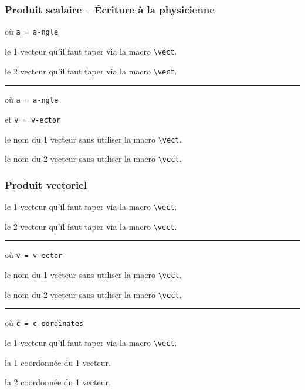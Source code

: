 \documentclass[12pt,a4paper]{article}
\newcommand\env[1]{\texttt{#1}}
\newcommand\macro[1]{\env{\textbackslash{}#1}}
\theoremstyle{definition}
\newcommand\separation{
	\medskip
	\hfill\rule{0.5\textwidth}{0.75pt}\hfill
	\medskip
}
\newcommand\mwhyprefix[2]{%
	\texttt{#1 = #1-#2}%
}
\begin{document}



\subsubsection{Produit scalaire -- Écriture \og à la physicienne \fg}

 où \quad \mwhyprefix{a}{ngle}


 le 1\ier{} vecteur qu'il faut taper via la macro \macro{vect}.

 le 2\ieme{} vecteur qu'il faut taper via la macro \macro{vect}.


\separation


 où \quad \mwhyprefix{a}{ngle} 
                              et \mwhyprefix{v}{ector}

 le nom du 1\ier{} vecteur sans utiliser la macro \macro{vect}.

 le nom du 2\ieme{} vecteur sans utiliser la macro \macro{vect}.





\subsubsection{Produit vectoriel}



 le 1\ier{} vecteur qu'il faut taper via la macro \macro{vect}.

 le 2\ieme{} vecteur qu'il faut taper via la macro \macro{vect}.


\separation


 où \quad \mwhyprefix{v}{ector}

 le nom du 1\ier{} vecteur sans utiliser la macro \macro{vect}.

 le nom du 2\ieme{} vecteur sans utiliser la macro \macro{vect}.


\separation


  où \quad \mwhyprefix{c}{oordinates}

 le 1\ier{} vecteur qu'il faut taper via la macro \macro{vect}.

 la 1\iere{} coordonnée du 1\ier{} vecteur.

 la 2\ieme{} coordonnée du 1\ier{} vecteur.
\end{document}
